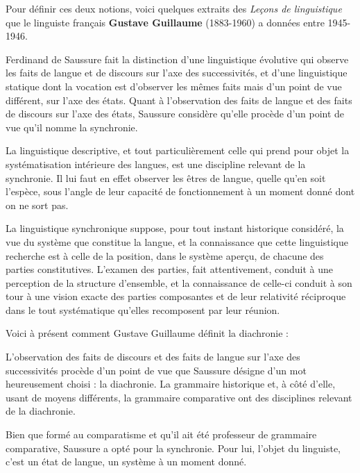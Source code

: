 Pour définir ces deux notions, voici quelques extraits des \textit{Leçons de linguistique} que le linguiste français \textbf{Gustave Guillaume} (1883-1960) a données entre 1945-1946.
\begin{lecture}{}
Ferdinand de Saussure fait la distinction d’une linguistique évolutive qui observe les faits de langue et de discours sur l’axe des successivités, et d’une linguistique statique dont la vocation est d’observer les mêmes faits mais d’un point de vue différent, sur l’axe des états. Quant à l’observation des faits de langue et des faits de discours sur l’axe des états, Saussure considère qu’elle procède d’un point de vue qu’il nomme la synchronie.

La linguistique descriptive, et tout particulièrement celle qui prend pour objet la systématisation intérieure des langues, est une discipline relevant de la synchronie. Il lui faut en effet observer les êtres de langue, quelle qu’en soit l’espèce, sous l’angle de leur capacité de fonctionnement à un moment donné dont on ne sort pas.
\end{lecture}

\begin{lecture}{}
La linguistique synchronique suppose, pour tout instant historique considéré, la vue du système que constitue la langue, et la connaissance que cette linguistique recherche est à celle de la position, dans le système aperçu, de chacune des parties constitutives. L’examen des parties, fait attentivement, conduit à une perception de la structure d’ensemble, et la connaissance de celle-ci conduit à son tour à une vision exacte des parties composantes et de leur relativité réciproque dans le tout systématique qu’elles recomposent par leur réunion.
\end{lecture}

Voici à présent comment Gustave Guillaume définit la diachronie :
\begin{lecture}{}
L’observation des faits de discours et des faits de langue sur l’axe des successivités procède d’un point de vue que Saussure désigne d’un mot heureusement choisi : la diachronie. La grammaire historique et, à côté d’elle, usant de moyens différents, la grammaire comparative ont des disciplines relevant de la diachronie.
\end{lecture}
Bien que formé au comparatisme et qu’il ait été professeur de grammaire comparative, Saussure a opté pour la synchronie. Pour lui, l’objet du linguiste, c’est un état de langue, un système à un moment donné.

